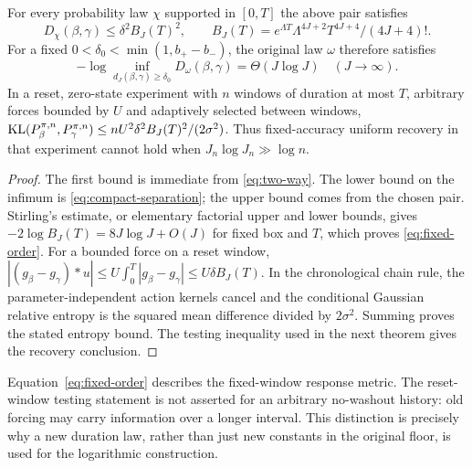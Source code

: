 \begin{theorem}
\label{thm:fixed-frontier}
For every probability law $\chi$ supported in $[0,T]$ the above pair satisfies
\[
 D_\chi(\beta,\gamma)\le\delta^2 B_J(T)^2,\qquad
 B_J(T)=e^{\Lambda T}\Lambda^{4J+2}T^{4J+4}/(4J+4)!.
\]
For a fixed $0<\delta_0<\min(1,b_+-b_-)$, the original law $\omega$ therefore
satisfies
\begin{equation}
 -\log\inf_{d_J(\beta,\gamma)\ge\delta_0}D_\omega(\beta,\gamma)
                =\Theta(J\log J)\quad(J\to\infty).
 \label{eq:fixed-order}
\end{equation}
In a reset, zero-state experiment with $n$ windows of duration at most $T$,
arbitrary forces bounded by $U$ and adaptively selected between windows,
$\operatorname{KL}(P_\beta^{\pi,n},P_\gamma^{\pi,n})\le
nU^2\delta^2B_J(T)^2/(2\sigma^2)$. Thus fixed-accuracy uniform recovery in
that experiment cannot hold when $J_n\log J_n\gg\log n$.
\end{theorem}
\begin{proof}
The first bound is immediate from \eqref{eq:two-way}. The lower bound on the
infimum is \eqref{eq:compact-separation}; the upper bound comes from the
chosen pair. Stirling's estimate, or elementary factorial upper and lower
bounds, gives $-2\log B_J(T)=8J\log J+O(J)$ for fixed box and $T$,
which proves \eqref{eq:fixed-order}. For a bounded force on a reset window,
$|(g_\beta-g_\gamma)*u|\le U\int_0^T|g_\beta-g_\gamma|\le U\delta B_J(T)$.
In the chronological chain rule, the parameter-independent action kernels
cancel and the conditional Gaussian relative entropy is the squared mean
difference divided by $2\sigma^2$. Summing proves the stated entropy bound.
The testing inequality used in the next theorem gives the recovery conclusion.
\end{proof}

\begin{remark}
Equation~\eqref{eq:fixed-order} describes the fixed-window response metric.
The reset-window testing statement is not asserted for an arbitrary
no-washout history: old forcing may carry information over a longer interval.
This distinction is precisely why a new duration law, rather than just new
constants in the original floor, is used for the logarithmic construction.
\end{remark}

